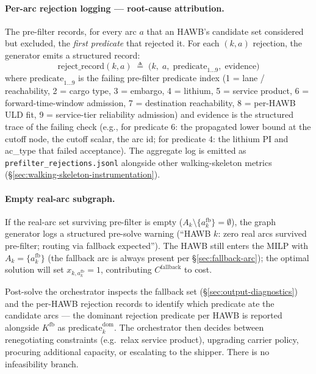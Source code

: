 \documentclass[11pt,a4paper]{article}
\newcommand{\defeq}{\triangleq}
\theoremstyle{definition}
\begin{document}
\paragraph{Per-arc rejection logging --- root-cause attribution.}
The pre-filter records, for every arc $a$ that an HAWB's candidate set
considered but excluded, the \emph{first predicate} that rejected it.
For each $(k, a)$ rejection, the generator emits a structured record:
\begin{equation*}
  \text{reject\_record}(k, a) \;\defeq\; \bigl(k,\; a,\;
    \text{predicate}_{1\ldots 9},\; \text{evidence}\bigr)
\end{equation*}
where $\text{predicate}_{1\ldots 9}$ is the failing pre-filter predicate
index (1 = lane / reachability, 2 = cargo type, 3 = embargo, 4 =
lithium, 5 = service product, 6 = forward-time-window admission, 7 =
destination reachability, 8 = per-HAWB ULD fit, 9 = service-tier
reliability admission) and $\text{evidence}$
is the structured trace of the failing check (e.g., for predicate 6:
the propagated lower bound at the cutoff node, the cutoff scalar, the
arc id; for predicate 4: the lithium PI and ac\_type that failed
acceptance). The aggregate log is emitted as
\texttt{prefilter\_rejections.jsonl} alongside other walking-skeleton
metrics (\S\ref{sec:walking-skeleton-instrumentation}).

\paragraph{Empty real-arc subgraph.}
If the real-arc set surviving pre-filter is empty ($A_k \setminus
\{a^{\text{fb}}_k\} = \emptyset$), the graph generator logs a structured
pre-solve warning (``HAWB $k$: zero real arcs survived pre-filter; routing
via fallback expected''). The HAWB still enters the MILP with $A_k =
\{a^{\text{fb}}_k\}$ (the fallback arc is always present per
\S\ref{sec:fallback-arc}); the optimal solution will set $x_{k,
a^{\text{fb}}_k} = 1$, contributing $C^{\text{fallback}}$ to cost.

Post-solve the orchestrator inspects the fallback set
(\S\ref{sec:output-diagnostics}) and the per-HAWB rejection records to
identify which predicate ate the candidate arcs --- the dominant rejection
predicate per HAWB is reported alongside $K^{\text{fb}}$ as
$\text{predicate}^{\text{dom}}_k$. The orchestrator then decides between
renegotiating constraints (e.g.\ relax service product), upgrading carrier
policy, procuring additional capacity, or escalating to the shipper.
There is no infeasibility branch.
\end{document}
